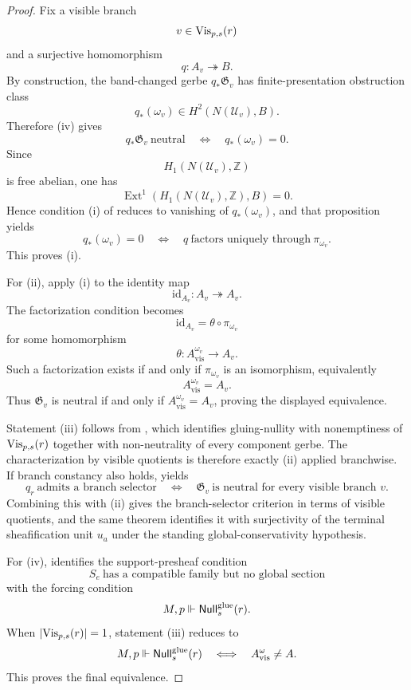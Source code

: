 \begin{proof}
Fix a visible branch
\[
v\in \mathrm{Vis}_{p,s}(r)
\]
and a surjective homomorphism
\[
q:A_v\twoheadrightarrow B.
\]
By construction, the band-changed gerbe $q_*\mathfrak G_v$ has finite-presentation obstruction class
\[
q_*(\omega_v)\in H^2(N(\mathcal U_v),B).
\]
Therefore (iv) gives
\[
q_*\mathfrak G_v\ \text{neutral}
\quad\Longleftrightarrow\quad
q_*(\omega_v)=0.
\]
Since
\[
H_1(N(\mathcal U_v),\mathbb Z)
\]
is free abelian, one has
\[
\operatorname{Ext}^1(H_1(N(\mathcal U_v),\mathbb Z),B)=0.
\]
Hence condition \textup{(i)} of  reduces to vanishing of $q_*(\omega_v)$, and that proposition yields
\[
q_*(\omega_v)=0
\quad\Longleftrightarrow\quad
q\ \text{factors uniquely through}\ \pi_{\omega_v}.
\]
This proves \textup{(i)}.

For \textup{(ii)}, apply \textup{(i)} to the identity map
\[
\mathrm{id}_{A_v}:A_v\twoheadrightarrow A_v.
\]
The factorization condition becomes
\[
\mathrm{id}_{A_v}=\theta\circ \pi_{\omega_v}
\]
for some homomorphism
\[
\theta:A_{\mathrm{vis}}^{\omega_v}\to A_v.
\]
Such a factorization exists if and only if $\pi_{\omega_v}$ is an isomorphism, equivalently
\[
A_{\mathrm{vis}}^{\omega_v}=A_v.
\]
Thus $\mathfrak G_v$ is neutral if and only if $A_{\mathrm{vis}}^{\omega_v}=A_v$, proving the displayed equivalence.

Statement \textup{(iii)} follows from , which identifies gluing-nullity with nonemptiness of $\mathrm{Vis}_{p,s}(r)$ together with non-neutrality of every component gerbe. The characterization by visible quotients is therefore exactly \textup{(ii)} applied branchwise. If branch constancy also holds,  yields
\[
q_r\ \text{admits a branch selector}
\quad\Longleftrightarrow\quad
\mathfrak G_v\ \text{is neutral for every visible branch }v.
\]
Combining this with \textup{(ii)} gives the branch-selector criterion in terms of visible quotients, and the same theorem identifies it with surjectivity of the terminal sheafification unit $u_a$ under the standing global-conservativity hypothesis.

For \textup{(iv)},  identifies the support-presheaf condition
\[
S_e\ \text{has a compatible family but no global section}
\]
with the forcing condition
\[
M,p\Vdash \mathsf{Null}^{\mathrm{glue}}_s(r).
\]
When $|\mathrm{Vis}_{p,s}(r)|=1$, statement \textup{(iii)} reduces to
\[
M,p\Vdash \mathsf{Null}^{\mathrm{glue}}_s(r)
\quad\Longleftrightarrow\quad
A_{\mathrm{vis}}^{\omega}\neq A.
\]
This proves the final equivalence.
\end{proof}

